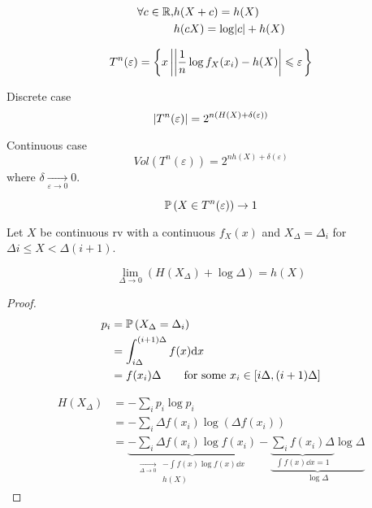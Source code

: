 \begin{proposition}
    \[
        \begin{aligned}
            \forall c \in \mathbb{R}, &h(X + c) = h(X)\\
            &h(cX) = \log \lvert c \rvert + h(X)
        \end{aligned}
    \]
\end{proposition}

\begin{definition}
    \[
        T^n(\varepsilon) = \left\{ x \left\vert \left\lvert \frac{1}{n} \log f_X(x_i) - h(X) \right\rvert \leqslant \varepsilon \right. \right\}
    \]
\end{definition}

\begin{proposition}
    Discrete case
    \[
        \left\lvert T^n(\varepsilon)\right\rvert = 2^{n(H(X) + \delta(\varepsilon))}
    \]

    Continuous case
    \[
        Vol(T^n(\varepsilon)) = 2^{nh(X) + \delta(\varepsilon)}
    \]
    where $\delta \underset{\varepsilon \to 0}{\to} 0$.
\end{proposition}

\begin{proposition}
    \[
        \mathbb{P}\left( X \in T^n(\varepsilon) \right) \to 1
    \]
\end{proposition}

Let $X$ be continuous rv with a continuous $f_X(x)$ and $X_\Delta = \Delta_i$ for $\Delta i \leqslant X < \Delta(i+1)$.

\begin{theorem}
    \[
        \lim\limits_{\Delta \to 0}( H(X_\Delta) + \log \Delta) = h(X)
    \]
\end{theorem}
\begin{proof}
    \[
        \begin{aligned}
            p_i &= \mathbb{P}\left( X_\Delta = \Delta_i \right)\\
            &= \int_{i\Delta}^{(i+1)\Delta} f(x) \mathrm{d} x\\
            &= f(x_i) \Delta \text{\qquad for some }x_i\in [i\Delta, (i+1)\Delta]
        \end{aligned}
    \]
    
    \[
        \begin{aligned}
            H(X_\Delta) &= - \sum\limits_i p_i\log p_i\\
            &= - \sum\limits_i \Delta f(x_i) \log (\Delta f(x_i))\\
            &= \underbrace{- \sum\limits_i \Delta f(x_i) \log f(x_i)}_{\scriptscriptstyle \begin{aligned}\underset{\Delta \to 0}{\to} &-\int f(x) \log f(x)\dd x \\ &h(X) \end{aligned}} - \underbrace{\underbrace{\sum\limits_i f(x_i) \Delta}_{\int f(x) \dd x = 1} \log \Delta}_{\log \Delta}
        \end{aligned}            
    \]
\end{proof}









